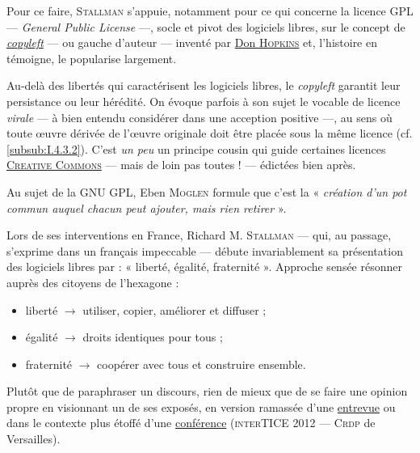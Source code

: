 \label{page:copyleft}%
Pour ce faire, \textsc{Stallman} s'appuie, notamment pour ce qui concerne la licence GPL --- \textit{General Public License} ---, socle et pivot des logiciels libres, sur le concept de \href{https://fr.wikipedia.org/wiki/Copyleft}{\textit{copyleft}} --- ou gauche d'auteur --- inventé par \href{https://fr.wikipedia.org/wiki/Don_Hopkins}{Don \textsc{Hopkins}} et, l'histoire en témoigne, le popularise largement.

Au-delà des libertés qui caractérisent les logiciels libres, le \textit{\gls{copyleft}} garantit leur persistance ou leur hérédité. On évoque parfois à son sujet le vocable de licence \emph{virale} --- à bien entendu considérer dans une acception positive ---, au sens où toute œuvre dérivée de l’œuvre originale doit être placée sous la même licence (cf. \cref{subsub:I.4.3.2}). C'est \emph{un peu} un principe cousin qui guide certaines licences \href{https://creativecommons.org/licenses/?lang=fr-FR}{\textsc{Creative Commons}} --- mais de loin pas toutes ! --- édictées bien après.

Au sujet de la GNU GPL, Eben \textsc{Moglen} formule que c'est la « \textit{création d'un pot commun auquel chacun peut ajouter, mais rien retirer} ».

Lors de ses interventions en France, Richard M. \textsc{Stallman} --- qui, au passage, s'exprime dans un français impeccable --- débute invariablement sa présentation des logiciels libres par : « liberté, égalité, fraternité ». Approche sensée résonner auprès des citoyens de l'hexagone :
\begin{itemize}
	\item liberté $\rightarrow$ utiliser, copier, améliorer et diffuser ;
	\item égalité $\rightarrow$ droits identiques pour tous ;
	\item fraternité $\rightarrow$  coopérer avec tous et construire ensemble.
\end{itemize}

Plutôt que de paraphraser un discours, rien de mieux que de se faire une opinion propre en visionnant un de ses exposés, en version ramassée d'une \href{https://www.dailymotion.com/video/xrup7t}{entrevue} ou dans le contexte plus étoffé d'une \href{https://www.youtube.com/watch?v=4KDMxzGC2Ag}{conférence} (\textsc{interTICE} 2012 --- \textsc{Crdp} de Versailles).

